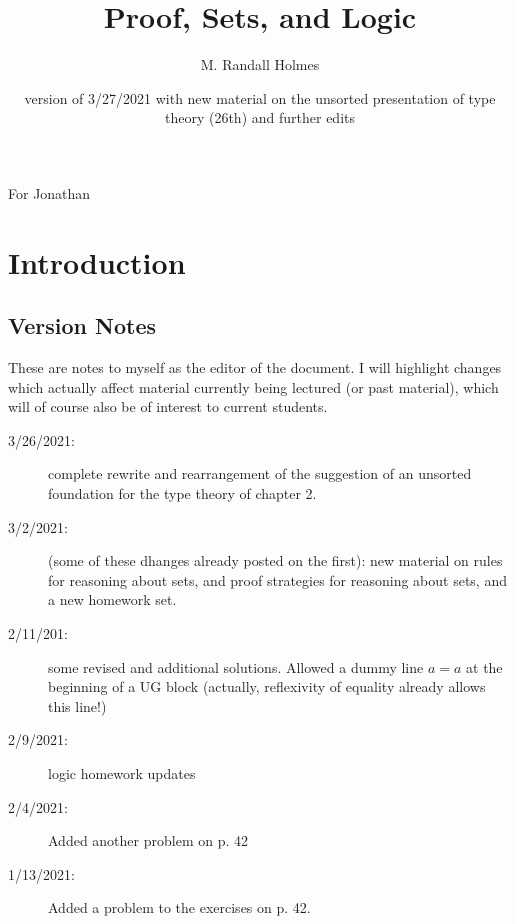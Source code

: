 \documentclass[12pt]{book}
\title{Proof, Sets, and Logic}
\author{M. Randall Holmes}
\date{version of 3/27/2021 with new material on the unsorted presentation of type theory (26th) and further edits}
\begin{document}
\maketitle

\newpage

\begin{centering}
For Jonathan\\
\end{centering}

\newpage

\tableofcontents

\newpage

\section{Introduction}

{\tiny

\subsection{Version Notes}

These are notes to myself as the editor of the document.  I will
highlight changes which actually affect material currently being
lectured (or past material), which will of course also be of interest
to current students.

\begin{description}

\item[3/26/2021:]  complete rewrite and rearrangement of the suggestion of an unsorted foundation for the type theory of chapter 2.

\item[3/2/2021:]  (some of these dhanges already posted on the first):  new material on rules for reasoning about sets, and proof strategies for reasoning about sets, and a new homework set.

\item[2/11/201:]  some revised and additional solutions.  Allowed a dummy line $a=a$ at the beginning of a UG block (actually, reflexivity of equality already allows this line!)

\item[2/9/2021:]  logic homework updates

\item[2/4/2021:]  Added another problem on p. 42

\item[1/13/2021:]  Added a problem to the exercises on p. 42.


\end{description}}
\end{document}
